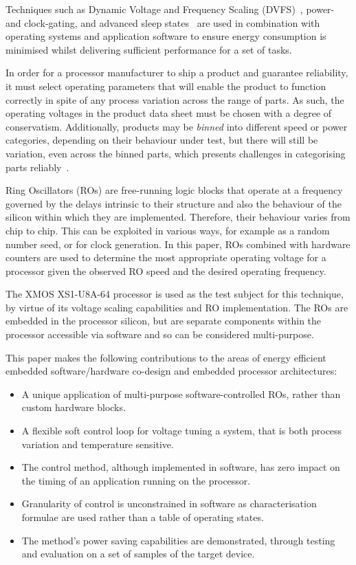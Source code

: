 \documentclass[a4paper,twocolumn,DIV=16]{scrartcl}
\begin{document}
Techniques such as Dynamic Voltage and Frequency Scaling
(DVFS)~\cite{burd2000scaled}, power- and clock-gating, and advanced sleep
states~\cite{pgsleep} are used in combination with operating systems and
application software to ensure energy consumption is minimised whilst delivering
sufficient performance for a set of tasks.

In order for a processor manufacturer to ship a product and guarantee
reliability, it must select operating parameters that will enable the product to
function correctly in spite of any process variation across the range of parts.
As such, the operating voltages in the product data sheet must be chosen with a
degree of conservatism. Additionally, products may be \emph{binned} into
different speed or power categories, depending on their behaviour under test,
but there will still be variation, even across the binned parts, which presents
challenges in categorising parts reliably~\cite{Sartori2010}.

Ring Oscillators (ROs) are free-running logic blocks that operate at a frequency
governed by the delays intrinsic to their structure and also the behaviour of
the silicon within which they are implemented. Therefore, their behaviour varies
from chip to chip. This can be exploited in various ways, for example as a
random number seed, or for clock generation. In this paper, ROs combined with
hardware counters are used to determine the most appropriate operating voltage
for a processor given the observed RO speed and the desired operating frequency.

The XMOS XS1-U8A-64 processor is used as the test subject for this technique, by
virtue of its voltage scaling capabilities and RO implementation. The ROs are
embedded in the processor silicon, but are separate components within the
processor accessible via software and so can be considered multi-purpose.

This paper makes the following contributions to the areas of energy efficient
embedded software/hardware co-design and embedded processor architectures:

\begin{itemize}
\item A unique application of multi-purpose software-controlled ROs, rather than
custom hardware blocks.
\item A flexible soft control loop for voltage tuning a system, that is both
process variation and temperature sensitive.
\item The control method, although implemented in software, has zero impact on
the timing of an application running on the processor.
\item Granularity of control is unconstrained in software as characterisation
formulae are used rather than a table of operating states.
\item The method's power saving capabilities are demonstrated, through testing
and evaluation on a set of samples of the target device.
\end{itemize}
\end{document}
